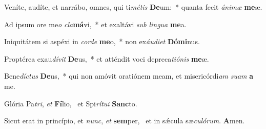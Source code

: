 \item Veníte, audíte, et narrábo, omnes, qui ti\textit{mé}\textit{tis} \textbf{De}um:~* quanta fecit \textit{á}\textit{ni}\textit{mæ} \textbf{me}æ.
\item Ad ipsum ore me\textit{o} \textit{cla}\textbf{má}vi,~* et exaltávi \textit{sub} \textit{lin}\textit{gua} \textbf{me}a.
\item Iniquitátem si aspéxi in \textit{cor}\textit{de} \textbf{me}o,~* non ex\textit{áu}\textit{di}\textit{et} \textbf{Dó}\textbf{mi}nus.
\item Proptérea exau\textit{dí}\textit{vit} \textbf{De}us,~* et atténdit voci depreca\textit{ti}\textit{ó}\textit{nis} \textbf{me}æ.
\item Bene\textit{díc}\textit{tus} \textbf{De}us,~* qui non amóvit oratiónem meam, et misericórdi\textit{am} \textit{su}\textit{am} \textbf{a} me.
\item Glória Pa\textit{tri}, \textit{et} \textbf{Fí}lio,~\psstar{} et Spi\textit{rí}\textit{tu}\textit{i} \textbf{Sanc}to.
\item Sicut erat in princípio, et \textit{nunc}, \textit{et} \textbf{sem}per,~\psstar{} et in sǽcula sæ\textit{cu}\textit{ló}\textit{rum}. \textbf{A}men.

